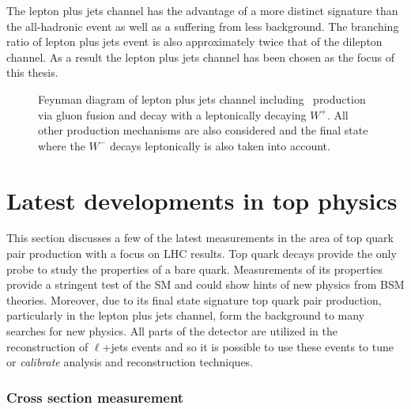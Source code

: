 The lepton plus jets channel has the advantage of a more distinct signature than the all-hadronic event as well as a suffering from less background. The branching ratio of lepton plus jets event is also approximately twice that of the dilepton channel. As a result the lepton plus jets channel has been chosen as the focus of this thesis.

\begin{figure}[htbp]
  \centering
  \begin{minipage}[][][t]{.60\textwidth}
  
  \end{minipage}
  \caption[Feynman diagram of lepton plus jets channel including \ttbar\ production via gluon fusion and decay with a leptonically decaying $W^{+}$.]{Feynman diagram of lepton plus jets channel including \ttbar\ production via gluon fusion and decay with a leptonically decaying $W^{+}$. All other production mechanisms are also considered and the final state where the $W^{-}$ decays leptonically is also taken into account.}\label{fig:TopQuarkFullLPlusJets}
\end{figure}

\section{Latest developments in top physics}

This section discusses a few of the latest measurements in the area of top quark pair production with a focus on LHC results. Top quark decays provide the only probe to study the properties of a bare quark. Measurements of its properties provide a stringent test of the SM and could show hints of new physics from BSM theories. Moreover, due to its final state signature top quark pair production, particularly in the lepton plus jets channel, form the background to many searches for new physics.  All parts of the detector are utilized in the reconstruction of $\ell$+jets events and so it is possible to use these events to tune or \textit{calibrate} analysis and reconstruction techniques.

\subsubsection{Cross section measurement}

